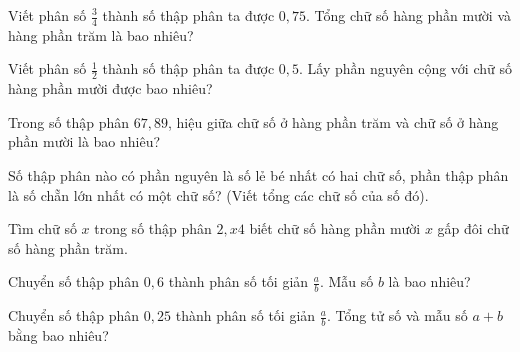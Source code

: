 \begin{ex}
  Viết phân số $\frac{3}{4}$ thành số thập phân ta được $0{,}75$. Tổng chữ số hàng phần mười và hàng phần trăm là bao nhiêu?
\end{ex}

\begin{ex}
  Viết phân số $\frac{1}{2}$ thành số thập phân ta được $0{,}5$. Lấy phần nguyên cộng với chữ số hàng phần mười được bao nhiêu?
\end{ex}

\begin{ex}
  Trong số thập phân $67{,}89$, hiệu giữa chữ số ở hàng phần trăm và chữ số ở hàng phần mười là bao nhiêu?
\end{ex}

\begin{ex}
  Số thập phân nào có phần nguyên là số lẻ bé nhất có hai chữ số, phần thập phân là số chẵn lớn nhất có một chữ số? (Viết tổng các chữ số của số đó).
\end{ex}

\begin{ex}
  Tìm chữ số $x$ trong số thập phân $2{,}x4$ biết chữ số hàng phần mười $x$ gấp đôi chữ số hàng phần trăm.
\end{ex}

\begin{ex}
  Chuyển số thập phân $0{,}6$ thành phân số tối giản $\frac{a}{b}$. Mẫu số $b$ là bao nhiêu?
\end{ex}

\begin{ex}
  Chuyển số thập phân $0{,}25$ thành phân số tối giản $\frac{a}{b}$. Tổng tử số và mẫu số $a + b$ bằng bao nhiêu?
\end{ex}

